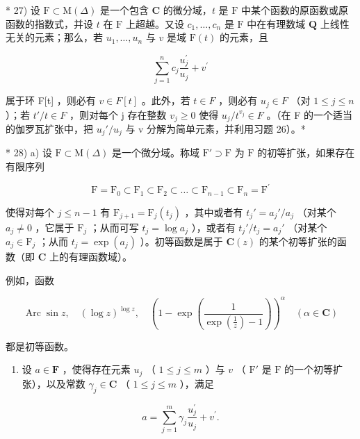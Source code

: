 * 27) 设 \(\mathrm{F} \subset \mathrm{M}(\Delta)\) 是一个包含 \(\mathbf{C}\) 的微分域，\(t\) 是 \(\mathrm{F}\) 中某个函数的原函数或原函数的指数式，并设 \(t\) 在 \(\mathrm{F}\) 上超越。又设 \(c_1, \ldots, c_n\) 是 \(\mathrm{F}\) 中在有理数域 \(\mathbf{Q}\) 上线性无关的元素；那么，若 \(u_1, \ldots, u_n\) 与 \(v\) 是域 \(\mathrm{F}(t)\) 的元素，且

\[
\sum_ {j = 1} ^ {n} c _ {j} \frac {u _ {j} ^ {\prime}}{u _ {j}} + v ^ {\prime}
\]

属于环 F{[}t{]} ，则必有 \(v \in F[t]\) 。此外，若 \(t \in F\) ，则必有 \(u_{j} \in F\) （对 \(1 \leqslant j \leqslant n\) ）；若 \(t' / t \in F\) ，则对每个 j 存在整数 \(v_{j} \geqslant 0\) 使得 \(u_{j} / t^{v_{j}} \in F\) 。（在 F 的一个适当的伽罗瓦扩张中，把 \(u_{j}' / u_{j}\) 与 v 分解为简单元素，并利用习题 26）。*

* 28) a) 设 \(\mathrm{F} \subset \mathrm{M}(\Delta)\) 是一个微分域。称域 \(\mathrm{F}' \supset \mathrm{F}\) 为 \(\mathrm{F}\) 的初等扩张，如果存在有限序列

\[
\mathrm{F} = \mathrm{F} _ {0} \subset \mathrm{F} _ {1} \subset \mathrm{F} _ {2} \subset \dots \subset \mathrm{F} _ {n - 1} \subset \mathrm{F} _ {n} = \mathrm{F} ^ {\prime}\tag{1}
\]

使得对每个 \(j \leqslant n - 1\) 有 \(\mathrm{F}_{j + 1} = \mathrm{F}_j(t_j)\) ，其中或者有 \(t_j' = a_j' / a_j\) （对某个 \(a_j \neq 0\) ，它属于 \(\mathrm{F}_j\) ；从而可写 \(t_j = \log a_j\) ），或者有 \(t_j' / t_j = a_j'\) （对某个 \(a_j \in \mathrm{F}_j\) ；从而 \(t_j = \exp(a_j)\) ）。初等函数是属于 \(\mathbf{C}(z)\) 的某个初等扩张的函数（即 \(\mathbf{C}\) 上的有理函数域）。

例如，函数

\[
\operatorname{Arc} \sin z, \quad (\log z) ^ {\log z}, \quad \left(1 - \exp \left(\frac {1}{\exp \left(\frac {1}{z}\right) - 1}\right)\right) ^ {\alpha} \quad (\alpha \in \mathbf {C})
\]

都是初等函数。

\begin{enumerate}
\def\labelenumi{\alph{enumi})}
\setcounter{enumi}{1}
\tightlist
\item
  设 \(a \in \mathbf{F}\) ，使得存在元素 \(u_{j}\) （ \(1 \leqslant j \leqslant m\) ）与 \(v\) （ \(\mathrm{F}'\) 是 \(\mathrm{F}\) 的一个初等扩张），以及常数 \(\gamma_{j} \in \mathbf{C}\) （ \(1 \leqslant j \leqslant m\) ），满足
\end{enumerate}

\[
a = \sum_ {j = 1} ^ {m} \gamma_ {j} \frac {u _ {j} ^ {\prime}}{u _ {j}} + v ^ {\prime}.\tag{*}
\]

